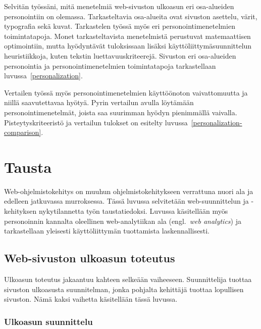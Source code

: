 \documentclass[finnish, 12pt, a4paper, elec, utf8, a-1b, online]{aaltothesis}
\begin{document}
Selvitän työssäni, mitä menetelmiä web-sivuston ulkoasun eri osa-alueiden
personointiin on olemassa. Tarkasteltavia osa-alueita ovat sivuston asettelu,
värit, typografia sekä kuvat. Tarkastelen työssä myös eri personointimenetelmien
toimintatapoja. Monet tarkasteltavista menetelmistä perustuvat matemaattisen
optimointiin, mutta hyödyntävät tuloksissaan lisäksi käyttöliittymäsuunnittelun
heuristiikkoja, kuten tekstin luettavuuskriteerejä. Sivuston eri osa-alueiden
personointia ja personointimenetelmien toimintatapoja tarkastellaan
luvussa~\ref{personalization}.

Vertailen työssä myös personointimenetelmien käyttöönoton vaivattomuutta ja
niillä saavutettavaa hyötyä. Pyrin vertailun avulla löytämään
personointimenetelmät, joista saa suurimman hyödyn pienimmällä vaivalla.
Pisteytyskriteeristö ja vertailun tulokset on esitelty
luvussa~\ref{personalization-comparison}.

\clearpage
\section{Tausta}\label{background}

Web-ohjelmistokehitys on muuhun ohjelmistokehitykseen verrattuna nuori ala ja
edelleen jatkuvassa murroksessa. Tässä luvussa selvitetään web-suunnittelun ja
-kehityksen nykytilannetta työn taustatiedoksi. Luvussa käsitellään myös
personoinnin kannalta oleellinen web-analytiikan ala (engl.~\textit{web
analytics}) ja tarkastellaan yleisesti käyttöliittymän tuottamista
laskennallisesti.

\subsection{Web-sivuston ulkoasun toteutus}

Ulkoasun toteutus jakaantuu kahteen selkeään vaiheeseen. Suunnittelija tuottaa
sivuston ulkoasusta suunnitelman, jonka pohjalta kehittäjä tuottaa lopullisen
sivuston. Nämä kaksi vaihetta käsitellään tässä luvussa.

\subsubsection{Ulkoasun suunnittelu}\label{background-web-design}
\end{document}
